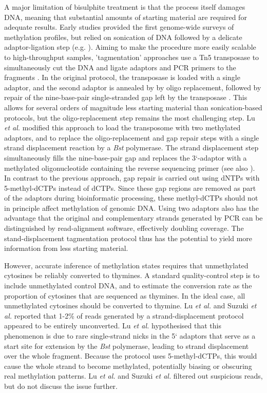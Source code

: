 \documentclass[10pt,letterpaper,draft]{article}
\begin{document}
A major limitation of bisulphite treatment is that the process itself damages DNA, meaning that substantial amounts of starting material are required for adequate results.
Early studies provided the first genome-wide surveys of methylation profiles, but relied on sonication of DNA followed by a delicate adaptor-ligation step (e.g. \cite{meissner2005reduced, cokus2008shotgun, lister2009human}).
Aiming to make the procedure more easily scalable to high-throughput samples, 'tagmentation' approaches use a Tn5 transposase to simultaneously cut the DNA and ligate adaptors and PCR primers to the fragments \cite{wang2013tagmentation}.
In the original protocol, the transposase is loaded with a single adaptor, and the second adaptor is annealed by by oligo replacement, followed by repair of the nine-base-pair single-stranded gap left by the transposase \cite{adey2012ultra}.
This allows for several orders of magnitude less starting material than sonication-based protocols, but the oligo-replacement step remains the most challenging step.
Lu \textit{et al.} \cite{lu2015improved} modified this approach to load the transposome with two methylated adaptors, and to replace the oligo-replacement and gap repair steps with a single strand displacement reaction by a \textit{Bst} polymerase.
The strand displacement step simultaneously fills the nine-base-pair gap and replaces the 3`-adaptor with a methylated oligonucleotide containing the
reverse sequencing primer (see also \cite{weichenhan2019generation, suzuki2018whole}).
In contrast to the previous approach, gap repair is carried out using dNTPs with 5-methyl-dCTPs instead of dCTPs.
Since these gap regions are removed as part of the adaptors during bioinformatic processing, these methyl-dCTPs should not in principle affect methylation of genomic DNA.
Using two adaptors also has the advantage that the original and complementary strands generated by PCR can be distinguished by read-alignment software, effectively doubling coverage. 
The stand-displacement tagmentation protocol thus has the potential to yield more information from less starting material.

However, accurate inference of methylation states requires that unmethylated cytosines be reliably converted to thymines.
A standard quality-control step is to include unmethylated control DNA, and to estimate the conversion rate as the proportion of cytosines that are sequenced as thymines.
In the ideal case, all unmethylated cytosines should be converted to thymine.
Lu \textit{et al.} \cite{lu2015improved} and Suzuki \textit{et al.} \cite{suzuki2018whole} reported that 1-2\% of reads generated by a strand-displacement protocol appeared to be entirely unconverted.
Lu \textit{et al.} \cite{lu2015improved} hypothesised that this phenomenon is due to rare single-strand nicks in the 5` adaptors that serve as a start site for extension by the \textit{Bst} polymerase, leading to strand displacement over the whole fragment.
Because the protocol uses 5-methyl-dCTPs, this would cause the whole strand to become methylated, potentially biasing or obscuring real methylation patterns.
Lu \textit{et al.} \cite{lu2015improved} and Suzuki \textit{et al.} \cite{suzuki2018whole} filtered out suspicious reads, but do not discuss the issue further.
\end{document}
